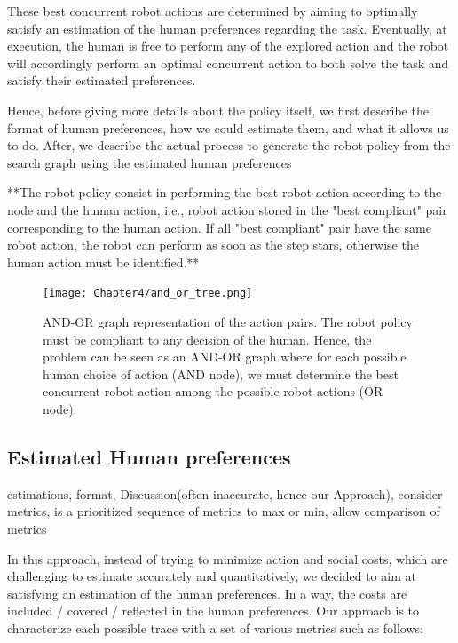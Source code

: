 These best concurrent robot actions are determined by aiming to optimally satisfy an estimation of the human preferences regarding the task. Eventually, at execution, the human is free to perform any of the explored action and the robot will accordingly perform an optimal concurrent action to both solve the task and satisfy their estimated preferences.

Hence, before giving more details about the policy itself, we first describe the format of human preferences, how we could estimate them, and what it allows us to do. After, we describe the actual process to generate the robot policy from the search graph using the estimated human preferences


**The robot policy consist in performing the best robot action according to the node and the human action, i.e., robot action stored in the "best compliant" pair corresponding to the human action.
If all "best compliant" pair have the same robot action, the robot can perform as soon as the step stars, otherwise the human action must be identified.**

\begin{figure}
    \texttt{[image: Chapter4/and\_or\_tree.png]}
    \caption{AND-OR graph representation of the action pairs. 
    The robot policy must be compliant to any decision of the human. Hence, the problem can be seen as an AND-OR graph where for each possible human choice of action (AND node), we must determine the best concurrent robot action among the possible robot actions (OR node).
    }
    \label{fig:and_or}
\end{figure}


    \subsection{Estimated Human preferences}
estimations, format, Discussion(often inaccurate, hence our Approach), consider metrics, is a prioritized sequence of metrics to max or min, allow comparison of metrics

In this approach, instead of trying to minimize action and social costs, which are challenging to estimate accurately and quantitatively, we decided to aim at satisfying an estimation of the human preferences. In a way, the costs are included / covered / reflected in the human preferences. Our approach is to characterize each possible trace with a set of various metrics such as follows:

